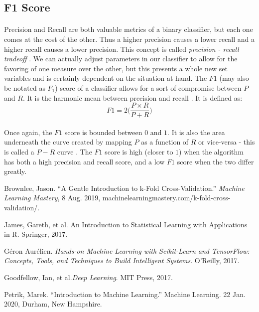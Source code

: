 \documentclass[12pt,letterpaper]{article}
\begin{document}

\subsection{F1 Score}
\paragraph*{}Precision and Recall are both valuable metrics of a binary classifier, but each one comes at the cost of the other. Thus a higher precision causes a lower recall and a higher recall causes a lower precision. This concept is called \textit{precision - recall tradeoff} \cite{Geron}. We can actually adjust parameters in our classifier to allow for the favoring of one measure over the other, but this presents a whole new set variables and is certainly dependent on the situation at hand.  The $F1$ (may also be notated as $F_1$) score of a classifier allows for a sort of compromise between $P$ and $R$. It is the harmonic mean between precision and recall \cite{Goodfellow}. It is defined as:
\begin{equation}
\label{F1 score}
F1 = 2\Big(\frac{P \times R}{P + R}\Big)
\end{equation}
\paragraph*{}Once again, the $F1$ score is bounded between $0$ and $1$. It is also the area underneath the curve created by mapping $P$ as a function of $R$ or vice-versa - this is called a $P-R$ curve \cite{Goodfellow}. The $F1$ score is high (closer to $1$) when the algorithm has both a high precision and recall score, and a low $F1$ score when the two differ greatly.




\begin{thebibliography}{9}


Brownlee, Jason. “A Gentle Introduction to k-Fold Cross-Validation.” \textit{Machine Learning Mastery}, 8 Aug. 2019, machinelearningmastery.com/k-fold-cross-validation/.

James, Gareth, et al. {An Introduction to Statistical Learning with Applications in R}. Springer, 2017.

Géron Aurélien. \textit{Hands-on Machine Learning with Scikit-Learn and TensorFlow: Concepts, Tools, and Techniques to Build Intelligent Systems}. O'Reilly, 2017.

Goodfellow, Ian, et al.\textit{Deep Learning}. MIT Press, 2017.

Petrik, Marek. “Introduction to Machine Learning.” Machine Learning. 22 Jan. 2020, Durham, New Hampshire.

\end{thebibliography}

\end{document}
